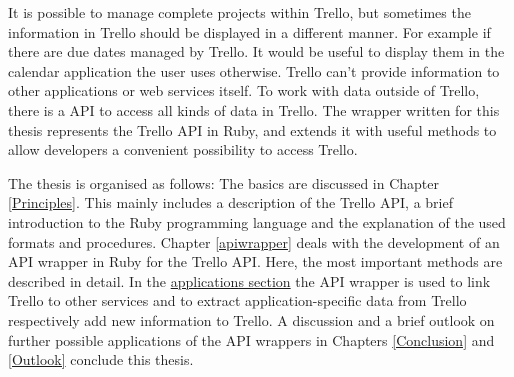 It is possible to manage complete projects within Trello, but sometimes the information in Trello should be displayed in a different manner. For example if there are due dates managed by Trello. It would be useful to display them in the calendar application the user uses otherwise. Trello can't provide information to other applications or web services itself. To work with data outside of Trello, there is a API to access all kinds of data in Trello. The wrapper written for this thesis represents the Trello API in Ruby, and extends it with useful methods to allow developers a convenient possibility to access Trello.

The thesis is organised as follows: The basics are discussed in Chapter \ref{Principles}. This mainly includes a description of the Trello API, a brief introduction to the Ruby programming language and the explanation of the used formats and procedures. Chapter \ref{apiwrapper} deals with the development of an API wrapper in Ruby for the Trello API. Here, the most important methods are described in detail. In the \hyperref[applications]{applications section} the API wrapper is used to link Trello to other services and to extract application-specific data from Trello respectively add new information to Trello. A discussion and a brief outlook on further possible applications of the API wrappers in Chapters \ref{Conclusion} and \ref{Outlook} conclude this thesis.
